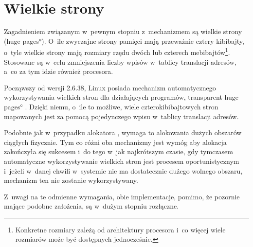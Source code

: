\section{Wielkie strony}

Zagadnieniem związanym w~pewnym stopniu z~mechanizmem  są wielkie
strony (\ang{huge pages}).  O~ile zwyczajne strony pamięci mają
przeważnie cztery kibibajty, o~tyle wielkie strony mają rozmiary rzędu
dwóch lub czterech mebibajtów\footnote{Konkretne rozmiary zależą od
  architektury procesora i~co więcej wiele rozmiarów może być
  dostępnych jednocześnie.}.  Stosowane są w~celu zmniejszenia liczby
wpisów w~tablicy translacji adresów, a~co za tym idzie również 
procesora.

Począwszy od wersji 2.6.38, Linux posiada mechanizm automatycznego
wykorzystywania wielkich stron dla działających programów,
\ang{transparent huge pages} \autocite{bib:v2.6.38}.  Dzięki niemu,
o~ile to możliwe, wiele czterokibibajtowych stron mapowanych jest za
pomocą pojedynczego wpisu w~tablicy translacji adresów.

Podobnie jak w~przypadku alokatora , wymaga to alokowania
dużych obszarów ciągłych fizycznie.  Tym co różni oba mechanizmy jest
wymóg aby alokacja  zakończyła się sukcesem i~do tego w~jak
najkrótszym czasie, gdy tymczasem automatyczne wykorzystywanie
wielkich stron jest procesem oportunistycznym i~jeżeli w~danej chwili
w~systemie nie ma dostatecznie dużego wolnego obszaru, mechanizm ten
nie zostanie wykorzystywany.

Z~uwagi na te odmienne wymagania, obie implementacje, pomimo, że
pozornie mające podobne założenia, są w~dużym stopniu rozłączne.
